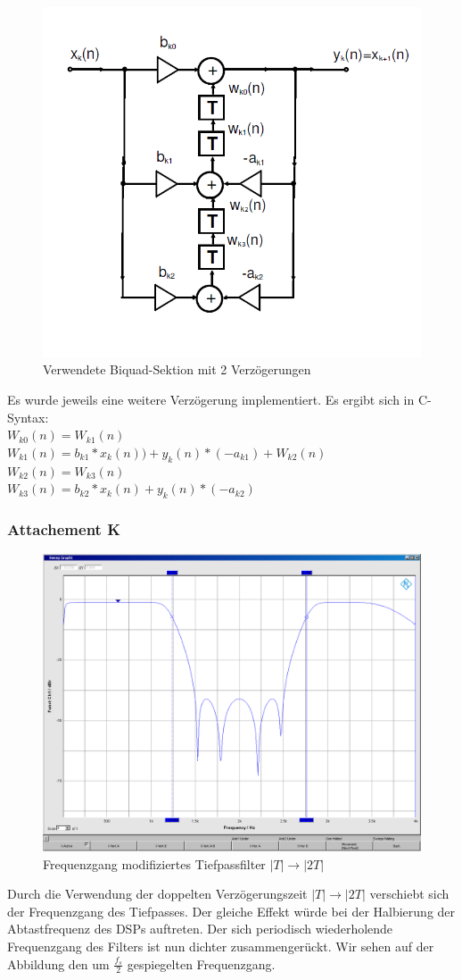\begin{figure}[h]
\centering
\includegraphics[width=0.7\linewidth]{Bilder/Biquad2T}
\caption{Verwendete Biquad-Sektion mit 2 Verzögerungen}
\label{fig:Biquad2T}
\end{figure}

\noindent Es wurde jeweils eine weitere Verzögerung implementiert. Es ergibt sich in C-Syntax:\\
$W_{k0}(n)=W_{k1}(n)$\\
$W_{k1}(n)=b_{k1}*x_k(n))+y_k(n)*(-a_{k1})+W_{k2}(n)$\\
$W_{k2}(n)=W_{k3}(n)$\\
$W_{k3}(n)=b_{k2}*x_k(n)+y_k(n)*(-a_{k2})$

\clearpage

\subsubsection{Attachement K}

	\begin{figure}[h]
		\centering
		\includegraphics[width=0.7\linewidth]{Bilder/ellip2T}
		\caption{Frequenzgang modifiziertes Tiefpassfilter $|T| \rightarrow |2T|$}
		\label{fig:ellip2T}
	\end{figure}
	
\noindent Durch die Verwendung der doppelten Verzögerungszeit $|T| \rightarrow |2T|$ verschiebt sich der Frequenzgang des Tiefpasses. Der gleiche Effekt würde bei der Halbierung der Abtastfrequenz des DSPs auftreten. Der sich periodisch wiederholende Frequenzgang des Filters ist nun dichter zusammengerückt. Wir sehen auf der Abbildung den um $\frac{f_s}{2}$ gespiegelten Frequenzgang. 

